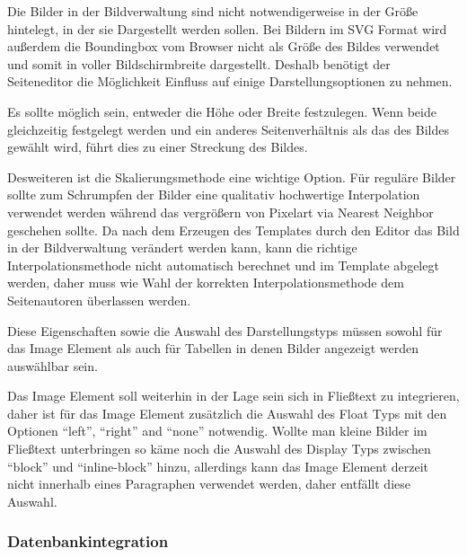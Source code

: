 Die Bilder in der Bildverwaltung sind nicht notwendigerweise in der Größe
hintelegt, in der sie Dargestellt werden sollen. Bei Bildern im SVG Format
wird außerdem die Boundingbox vom Browser nicht als Größe des Bildes verwendet
und somit in voller Bildschirmbreite dargestellt. Deshalb benötigt der
Seiteneditor die Möglichkeit Einfluss auf einige Darstellungsoptionen zu nehmen.

Es sollte möglich sein, entweder die Höhe oder Breite festzulegen. Wenn beide
gleichzeitig festgelegt werden und ein anderes Seitenverhältnis als das des
Bildes gewählt wird, führt dies zu einer Streckung des Bildes.


Desweiteren ist die Skalierungsmethode eine wichtige Option. Für reguläre Bilder
sollte zum Schrumpfen der Bilder eine qualitativ hochwertige Interpolation
verwendet werden während das vergrößern von Pixelart via Nearest Neighbor
geschehen sollte. Da nach dem Erzeugen des Templates durch den Editor das Bild
in der Bildverwaltung verändert werden kann, kann die richtige
Interpolationsmethode nicht automatisch berechnet und im Template abgelegt
werden, daher muss wie Wahl der korrekten Interpolationsmethode dem
Seitenautoren überlassen werden.


Diese Eigenschaften sowie die Auswahl des Darstellungstyps müssen sowohl für das
Image Element als auch für Tabellen in denen Bilder angezeigt werden auswählbar
sein.

Das Image Element soll weiterhin in der Lage sein sich in Fließtext zu
integrieren, daher ist für das Image Element zusätzlich die Auswahl des Float
Typs mit den Optionen ``left'', ``right'' and ``none'' notwendig. Wollte man
kleine Bilder im Fließtext unterbringen so käme noch die Auswahl des Display
Typs zwischen ``block'' und ``inline-block'' hinzu, allerdings kann das Image
Element derzeit nicht innerhalb eines Paragraphen verwendet werden, daher
entfällt diese Auswahl.

\subsubsection{Datenbankintegration}


